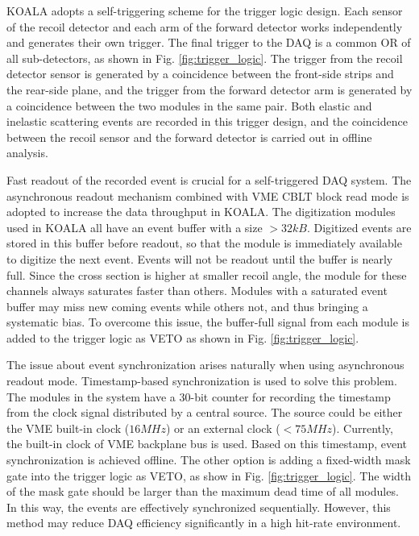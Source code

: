 \documentclass[number,5p]{elsarticle}
\begin{document}
KOALA adopts a self-triggering scheme for the trigger logic design.
Each sensor of the recoil detector and each arm of the forward detector works independently and generates their own trigger. 
The final trigger to the DAQ is a common OR of all sub-detectors, as shown in Fig. \ref{fig:trigger_logic}.
The trigger from the recoil detector sensor is generated by a coincidence between the front-side strips and the rear-side plane, 
and the trigger from the forward detector arm is generated by a coincidence between the two modules in the same pair.
Both elastic and inelastic scattering events are recorded in this trigger design, and the coincidence between the recoil sensor and the forward detector is carried out in offline analysis.

Fast readout of the recorded event is crucial for a self-triggered DAQ system.
The asynchronous readout mechanism combined with VME CBLT block read mode is adopted to increase the data throughput in KOALA.
The digitization modules used in KOALA all have an event buffer with a size $> 32 kB$.
Digitized events are stored in this buffer before readout, so that the module is immediately available to digitize the next event.
Events will not be readout until the buffer is nearly full.
Since the cross section is higher at smaller recoil angle, the module for these channels always saturates faster than others.
Modules with a saturated event buffer may miss new coming events while others
not, and thus bringing a systematic bias.
To overcome this issue, the buffer-full signal from each module is added to the trigger logic as VETO as shown in Fig. \ref{fig:trigger_logic}.

The issue about event synchronization arises naturally when using asynchronous
readout mode.
Timestamp-based synchronization is used to solve this problem.
The modules in the system have a 30-bit counter for recording the timestamp from
the clock signal distributed by a central source.
The source could be either the VME built-in clock ($16 MHz$) or an external clock
($< 75 MHz$).
Currently, the built-in clock of VME backplane bus is used. 
Based on this timestamp, event synchronization is achieved offline.
The other option is adding a fixed-width mask gate into the trigger logic as VETO, as show in Fig. \ref{fig:trigger_logic}.
The width of the mask gate should be larger than the maximum dead time of all modules.
In this way, the events are effectively synchronized sequentially. 
However, this method may reduce DAQ efficiency significantly in a high hit-rate environment.
\end{document}
